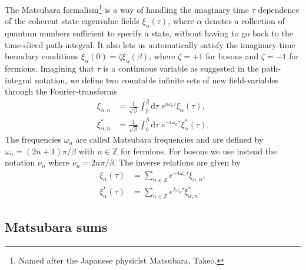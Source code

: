 The Matsubara formalism\footnote{Named after the Japanese physicist Matsubara, Takeo.} is a way of handling the imaginary time $\tau$
dependence of the coherent state eigenvalue fields $\xi_\alpha(\tau)$, where $\alpha$ denotes
a collection of quantum numbers sufficient to specify a state, without having to go back to the time-sliced path-integral. It also lets us
automatically satisfy the imaginary-time boundary conditions $\xi_\alpha(0) = \zeta\xi_\alpha(\beta)$, where $\zeta = +1$ for bosons
and $\zeta = -1$ for fermions. Imagining that $\tau$ is a continuous
variable as suggested in the path-integral notation, we define two countable infinite sets of new field-variables through the Fourier-transforms
\begin{subequations}
    \label{eq:Field:Mats:transformDef}
    \begin{align}
    \xi_{\alpha,n} &= \frac{1}{\sqrt{\beta}}\int_0^\beta\!\!\mathrm{d}\tau\;e^{i\omega_n\tau}\xi_\alpha(\tau),\label{eq:Field:Mats:transformDef:xi}\\
    \xi_{\alpha,n}^\ast &= \frac{1}{\sqrt{\beta}}\int_0^\beta\!\!\mathrm{d}\tau\;e^{-i\omega_n\tau}\xi_\alpha^\ast(\tau).\label{eq:Field:Mats:transformDef:xiAst}
    \end{align}
\end{subequations}
The frequencies $\omega_n$ are called Matsubara frequencies and are defined by $\omega_n = (2n+1)\pi/\beta$ with $n\in\mathbb{Z}$ for fermions. For bosons we use instead the notation
$\nu_n$ where $\nu_n = 2n\pi/\beta$. The inverse relations are given by 
\begin{subequations}
    \label{eq:Field:Mats:inverseTransform}
    \begin{align}
        \xi_\alpha(\tau) &= \sum_{n\in\mathbb{Z}}e^{-i\omega_n\tau}\xi_{\alpha,n},\label{eq:Field:Mats:inverseTransform:xi}\\
        \xi_\alpha^\ast(\tau) &= \sum_{n\in\mathbb{Z}}e^{i\omega_n\tau}\xi_{\alpha,n}^\ast.\label{eq:Field:Mats:inverseTransform:xiAst}
    \end{align}
\end{subequations}

\subsection{Matsubara sums}

